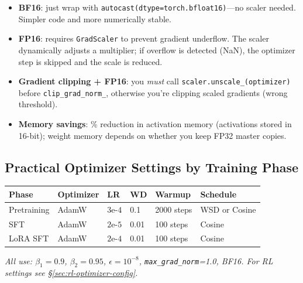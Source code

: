 \begin{intuitionbox}
\begin{itemize}
  \item \textbf{BF16}: just wrap with \texttt{autocast(dtype=torch.bfloat16)}---no scaler needed. Simpler code and more numerically stable.
  \item \textbf{FP16}: requires \texttt{GradScaler} to prevent gradient underflow. The scaler dynamically adjusts a multiplier; if overflow is detected (NaN), the optimizer step is skipped and the scale is reduced.
  \item \textbf{Gradient clipping + FP16}: you \emph{must} call \texttt{scaler.unscale\_(optimizer)} before \texttt{clip\_grad\_norm\_}, otherwise you’re clipping scaled gradients (wrong threshold).
  \item \textbf{Memory savings}: \% reduction in activation memory (activations stored in 16-bit); weight memory depends on whether you keep FP32 master copies.
\end{itemize}
\end{intuitionbox}

\subsection{Practical Optimizer Settings by Training Phase}
\label{practical-optimizer-settings-by-training-phase}

\begin{keybox}
\begin{tabular}{@{}lp{2.2cm}p{2.2cm}p{2.2cm}p{2.2cm}p{2.2cm}@{}}
\toprule
\textbf{Phase} & \textbf{Optimizer} & \textbf{LR} & \textbf{WD} & \textbf{Warmup} & \textbf{Schedule} \\
\midrule
Pretraining & AdamW & $3\text{e-}4$ & 0.1 & 2000 steps & WSD or Cosine \\
SFT & AdamW & $2\text{e-}5$ & 0.01 & 100 steps & Cosine \\
LoRA SFT & AdamW & $2\text{e-}4$ & 0.01 & 100 steps & Cosine \\
\bottomrule
\end{tabular}

\emph{All use: $\beta_1{=}0.9$, $\beta_2{=}0.95$, $\epsilon{=}10^{-8}$, \texttt{max\_grad\_norm}=1.0, BF16. For RL settings see §\ref{sec:rl-optimizer-config}.}
\end{keybox}

